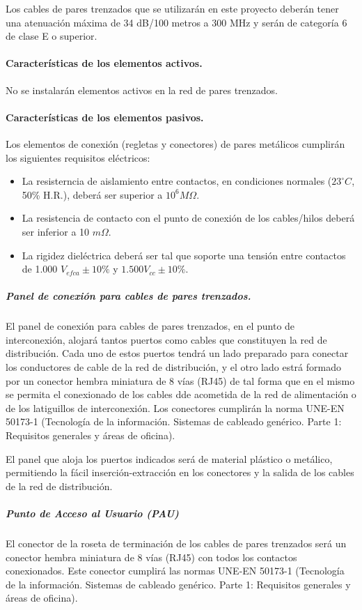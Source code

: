 Los cables de pares trenzados que se utilizarán en este proyecto deberán tener una atenuación máxima de 34 dB/100 metros a 300 MHz y serán de categoría 6 de clase E o superior.
\paragraph{Características de los elementos activos.}
No se instalarán elementos activos en la red de pares trenzados.
\paragraph{Características de los elementos pasivos.}
Los elementos de conexión (regletas y conectores) de pares metálicos cumplirán los siguientes requisitos eléctricos:
\begin{itemize}
	\item La resisterncia de aislamiento entre contactos, en condiciones normales ($23^{\circ}C$, 50\% H.R.), deberá ser superior a $10^{6} M\Omega.$ 
	\item La resistencia de contacto con el punto de conexión de los cables/hilos deberá ser inferior a 10 $m\Omega.$ 
	\item La rigidez dieléctrica deberá ser tal que soporte una tensión entre contactos de 1.000 $V_{efca}\pm10\%$ y $1.500 V_{cc}\pm10\%$.
\end{itemize}

\subparagraph{Panel de conexión para cables de pares trenzados.}
El panel de conexión para cables de pares trenzados, en el punto de interconexión, alojará tantos puertos como cables que constituyen la red de distribución. Cada uno de estos puertos tendrá un lado preparado para conectar los conductores de cable de la red de distribución, y el otro lado estrá formado por un conector hembra miniatura de 8 vías (RJ45) de tal forma que en el mismo se permita el conexionado de los cables dde acometida de la red de alimentación o de los latiguillos de interconexión. Los conectores cumplirán la norma UNE-EN 50173-1 (Tecnología de la información. Sistemas de cableado genérico. Parte 1: Requisitos generales y áreas de oficina).

El panel que aloja los puertos indicados será de material plástico o metálico, permitiendo la fácil inserción-extracción en los conectores y la salida de los cables de la red de distribución.

\subparagraph{Punto de Acceso al Usuario (PAU)}
El conector de la roseta de terminación de los cables de pares trenzados será un conector hembra miniatura de 8 vías (RJ45) con todos los contactos conexionados. Este conector cumplirá las normas UNE-EN 50173-1 (Tecnología de la información. Sistemas de cableado genérico. Parte 1: Requisitos generales y áreas de oficina).

